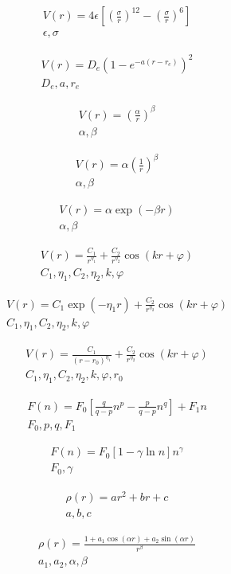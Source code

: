 \documentclass[a4paper,10pt]{article}
\begin{document}
\begin{eqnarray*}
V(r)=4\epsilon\left[\left(\frac{\sigma}{r}\right)^{12}-\left(\frac{\sigma}{r}\right)^{6}\right]\\
\epsilon,\sigma
\end{eqnarray*}

\begin{eqnarray*}
V(r)=D_e ( 1-e^{-a(r-r_e)} )^2 \\
D_e,a,r_e
\end{eqnarray*}

\begin{eqnarray*}
V(r)=\left(\frac{\alpha}{r}\right)^\beta \\
\alpha,\beta
\end{eqnarray*}

\begin{eqnarray*}
V(r)=\alpha\left(\frac{1}{r}\right)^\beta \\
\alpha,\beta
\end{eqnarray*}

\begin{eqnarray*}
V(r)=\alpha \exp\left(-\beta r\right) \\
\alpha,\beta
\end{eqnarray*}

\begin{eqnarray*}
V(r)=\frac{C_1}{r^{\eta_1}}+\frac{C_2}{r^{\eta_2}}\cos\left(kr+\varphi\right) \\
C_1,\eta_1,C_2,\eta_2,k,\varphi
\end{eqnarray*}

\begin{eqnarray*}
V(r)=C_1\exp\left(-\eta_1r\right)+\frac{C_2}{r^{\eta_2}}\cos\left(kr+\varphi\right) \\
C_1,\eta_1,C_2,\eta_2,k,\varphi
\end{eqnarray*}

\begin{eqnarray*}
V(r)=\frac{C_1}{\left(r-r_0\right)^{\eta_1}}+\frac{C_2}{r^{\eta_2}}\cos\left(kr+\varphi\right) \\
C_1,\eta_1,C_2,\eta_2,k,\varphi, r_0
\end{eqnarray*}

\begin{eqnarray*}
F(n)=F_0\left[\frac{q}{q-p}n^p-\frac{p}{q-p}n^q\right]+F_1n \\
F_0,p,q,F_1
\end{eqnarray*}

\begin{eqnarray*}
F(n)=F_0\left[1-\gamma\ln n\right]n^\gamma \\
F_0,\gamma
\end{eqnarray*}

\begin{eqnarray*}
\rho(r)=ar^2+br+c \\
a,b,c
\end{eqnarray*}

\begin{eqnarray*}
\rho(r)=\frac{1+a_1\cos\left(\alpha r\right)+a_2\sin\left(\alpha r\right)}{r^\beta} \\
a_1,a_2,\alpha,\beta
\end{eqnarray*}
\end{document}
